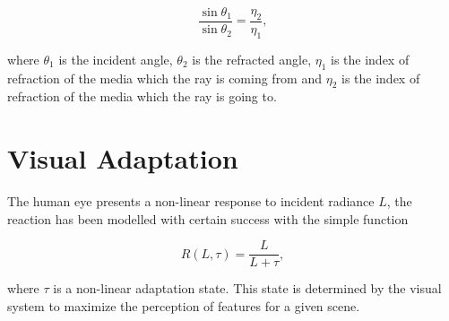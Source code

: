 \begin{equation}
\frac{\sin \theta_1}{\sin \theta_2} = \frac{\eta_2}{\eta_1},
\end{equation}

where $\theta_1$ is the incident angle, $\theta_2$ is the refracted angle, $\eta_1$ is the index of refraction of the media which the ray is coming from and $\eta_2$ is the index of refraction of the media which the ray is going to.

\section{Visual Adaptation}
\label{sec:visual_adaptation}

The human eye presents a non-linear response to incident radiance $L$, the reaction has been modelled  with certain success with the simple function 

\begin{equation}
R(L, \tau) = \frac{L}{L + \tau},
\end{equation}

where $\tau$ is a non-linear adaptation state.
This state is determined by the visual system to maximize the perception of features for a given scene.
